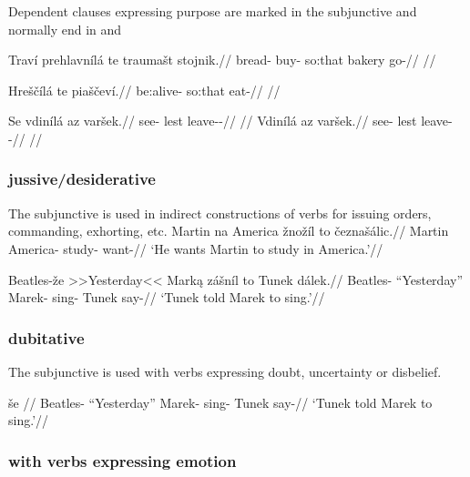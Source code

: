 Dependent clauses expressing purpose are marked in the subjunctive and normally end in  and 

\pex
\begingl
\gla Traví prehlavnílá te traumašt stojnik.//
\glb bread-\Gen{} buy- {so:that} bakery go-//
\glft {}//
\endgl
\xe

\pex
\begingl
\gla Hreščílá te piaščeví.//
\glb be:alive- {so:that} eat-//
\glft {}//
\endgl
\xe

\pex
\a
\begingl
\gla Se vdinílá az varšek.//
\glb \Refl{} see- {lest} leave-\Av{}-\Pf{}//
\glft {}//
\endgl
\a
\begingl
\gla Vdinílá az varšek.//
\glb see- {lest} leave-\Av{}-\Pf{}//
\glft {}//
\endgl
\xe



\subsubsection{jussive/desiderative}
\par The subjunctive is used in indirect constructions of verbs for issuing orders, commanding, exhorting, etc.
\pex
\begingl
\gla Martin na America žnožíl to čeznašálic.//
\glb Martin \Loc{} America-\Acc{} study-  want-//
\glft `He wants Martin to study in America.'//
\endgl
\xe

\pex
\begingl
\gla Beatles-že >>Yesterday<< Mark\k{a} zášníl to Tunek dálek.//
\glb Beatles-\Gen{} ``Yesterday'' Marek-\Agt{} sing-  Tunek say-//
\glft `Tunek told Marek to sing.'//
\endgl
\xe

\subsubsection{dubitative}
\par The subjunctive is used with verbs expressing doubt, uncertainty or disbelief.

\pex
\begingl
\gla še //
\glb Beatles-\Gen{} ``Yesterday'' Marek-\Agt{} sing-  Tunek say-//
\glft `Tunek told Marek to sing.'//
\endgl
\xe

\subsubsection{with verbs expressing emotion}

